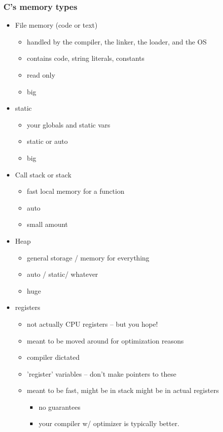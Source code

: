 \documentclass[11pt]{article}
\begin{document}
\subsubsection{C's memory types}
\label{sec:org99b2324}

\begin{itemize}
\item File memory (code or text) 
\begin{itemize}
\item handled by the compiler, the linker, the loader, and the OS
\item contains code, string literals, constants
\item read only
\item big
\end{itemize}
\item static 
\begin{itemize}
\item your globals and static vars
\item static or auto
\item big
\end{itemize}
\item Call stack or stack
\begin{itemize}
\item fast local memory for a function
\item auto
\item small amount
\end{itemize}
\item Heap
\begin{itemize}
\item general storage / memory for everything
\item auto / static/ whatever
\item huge
\end{itemize}
\item registers
\begin{itemize}
\item not actually CPU registers -- but you hope!
\item meant to be moved around for optimization reasons
\item compiler dictated
\item 'register' variables -- don't make pointers to these
\item meant to be fast, might be in stack might be in actual registers
\begin{itemize}
\item no guarantees
\item your compiler w/ optimizer is typically better.
\end{itemize}
\end{itemize}
\end{itemize}
\end{document}
